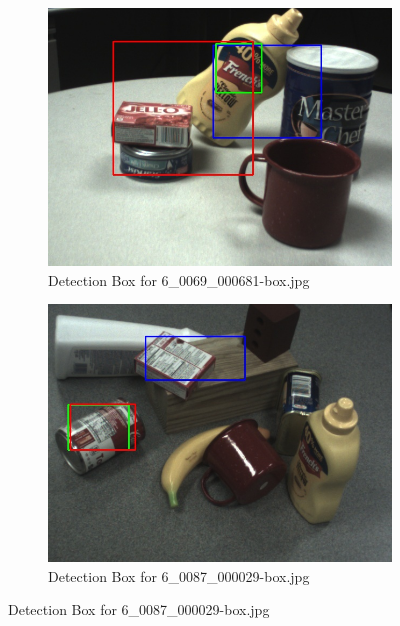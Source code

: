 \documentclass[10.5pt,a4paper]{article}
\begin{document}
    \clearpage
    
    \begin{figure}
    \begin{subfigure}{0.45\textwidth}
        \centering
        \includegraphics[width=\textwidth]{img/6_0069_000681-box.jpg}
        \caption{Detection Box for 6\_0069\_000681-box.jpg}
        \label{fig:img19}
    \end{subfigure}
    \hfill
    \begin{subfigure}{0.45\textwidth}
        \centering
        \includegraphics[width=\textwidth]{img/6_0087_000029-box.jpg}
        \caption{Detection Box for 6\_0087\_000029-box.jpg}
        \label{fig:img20}
    \end{subfigure}


\end{figure}
\end{document}
